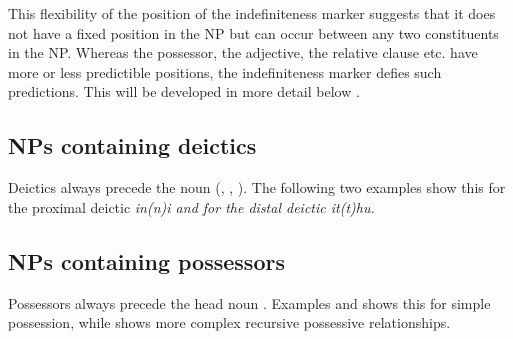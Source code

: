 This flexibility of the position of the indefiniteness marker suggests that it does not have a fixed position in the NP but can occur between any two constituents in the NP. Whereas the possessor, the adjective, the relative clause etc. have more or less predictible positions, the indefiniteness marker defies such predictions. This will be developed in more detail below .

%

\subsection{NPs containing deictics}\label{sec:nppp:NPscontainingdeictics}
Deictics always precede the noun (\citet[29]{Adelaar1991}, \citet[214]{Adelaar2005struct}, \citet[137]{Slomanson2006cll}). The following two examples show this for the proximal deictic \em in(n)i \em and for the distal deictic \em it(t)hu\em.






\subsection{NPs containing possessors}\label{sec:nppp:NPscontainingpossessors}
Possessors always precede the head noun \citep{Adelaar1991,Jayasuriya2002,Slomanson2006cll}. Examples  and  shows this for simple possession, while  shows more complex recursive possessive relationships.

